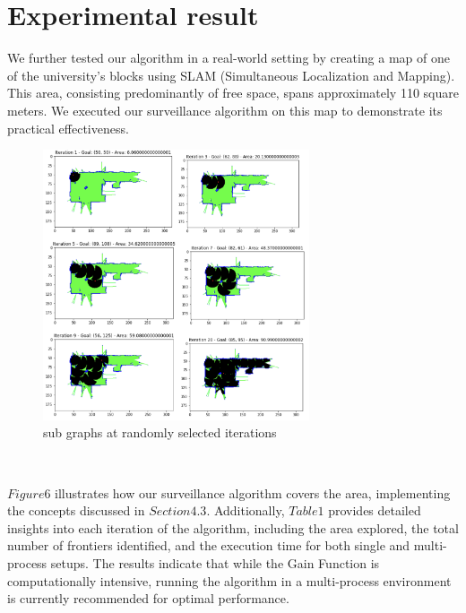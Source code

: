 \section{Experimental result}

We further tested our algorithm in a real-world setting by creating a map of one of the university's blocks using SLAM (Simultaneous Localization and Mapping). This area, consisting predominantly of free space, spans approximately 110 square meters. We executed our surveillance algorithm on this map to demonstrate its practical effectiveness.


 \begin{figure}[h]
  \centering
  \includegraphics[width=0.7\textwidth, height=0.3\textheight]{Bilder/grid_maps.png}
  \caption{sub graphs at randomly selected iterations}
  \label{fig:LOS}
\end{figure} \

\(Figure 6\) illustrates how our surveillance algorithm covers the area, implementing the concepts discussed in \(Section 4.3\). Additionally, \(Table 1\) provides detailed insights into each iteration of the algorithm, including the area explored, the total number of frontiers identified, and the execution time for both single and multi-process setups. The results indicate that while the Gain Function is computationally intensive, running the algorithm in a multi-process environment is currently recommended for optimal performance.


\label{appendix:Heuristic Goals Estimation}

